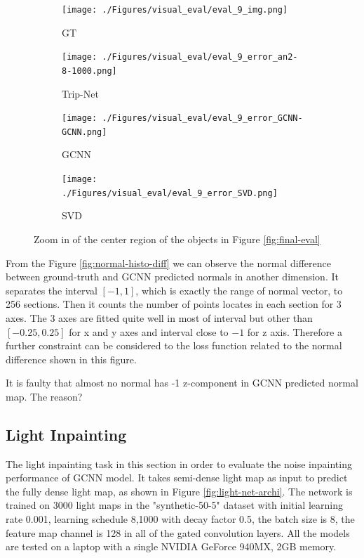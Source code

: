 \documentclass[border=15pt, multi, tikz]{article}
\begin{document}
\begin{figure}[H]
	
	\begin{subfigure}[b]{0.24\linewidth}
		\texttt{[image: ./Figures/visual\_eval/eval\_9\_img.png]}
		\caption{GT}
	\end{subfigure}
	\begin{subfigure}[b]{0.24\linewidth}
		\texttt{[image: ./Figures/visual\_eval/eval\_9\_error\_an2-8-1000.png]}
		\caption{Trip-Net}
	\end{subfigure}
	\begin{subfigure}[b]{0.24\linewidth}
		\texttt{[image: ./Figures/visual\_eval/eval\_9\_error\_GCNN-GCNN.png]}
		\caption{GCNN}
	\end{subfigure}
		\begin{subfigure}[b]{0.24\linewidth}
		\texttt{[image: ./Figures/visual\_eval/eval\_9\_error\_SVD.png]}
		\caption{SVD}
	\end{subfigure}
	
	\caption{Zoom in of the center region of the objects in Figure \ref{fig:final-eval}}
	\label{fig:tripnet-eval-synthetic-zoom-in}
\end{figure}






From the Figure \ref{fig:normal-histo-diff} we can observe the normal difference between ground-truth and GCNN predicted normals in another dimension. It separates the interval $ \left[ -1,1 \right] $, which is exactly the range of normal vector, to 256 sections. Then it counts the number of points locates in each section for 3 axes.  The 3 axes are fitted quite well in most of interval but other than $ \left[ -0.25,0.25 \right] $ for x and y axes and  interval close to $ -1 $ for z axis. Therefore a further constraint can be considered to the loss function related to the normal difference shown in this figure.

It is faulty that almost no normal has -1 z-component in GCNN predicted normal map. The reason?



\subsection{Light Inpainting}
The light inpainting task in this section in order to evaluate the noise inpainting performance of GCNN model. It takes semi-dense light map as input to predict the fully dense light map, as shown in Figure \ref{fig:light-net-archi}. 
The network is trained on 3000 light maps in the "synthetic-50-5" dataset with initial learning rate 0.001, learning schedule 8,1000 with decay factor 0.5, the batch size is 8, the feature map channel is 128 in all of the gated convolution layers. All the models are tested on a laptop with a single NVIDIA GeForce 940MX, 2GB memory.
\end{document}
